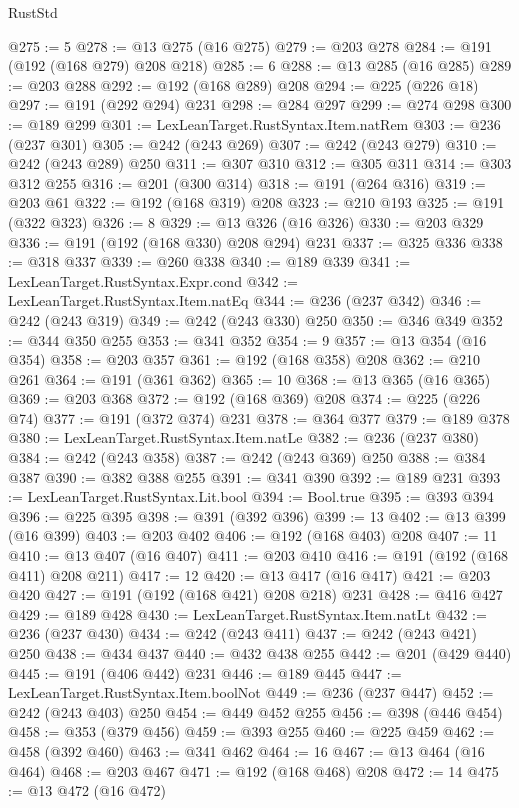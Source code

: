\begin{lexlean}{RustStd}
\begin{coremodule}
@275 := 5
@278 := @13 @275 (@16 @275)
@279 := @203 @278
@284 := @191 (@192 (@168 @279) @208 @218)
@285 := 6
@288 := @13 @285 (@16 @285)
@289 := @203 @288
@292 := @192 (@168 @289) @208
@294 := @225 (@226 @18)
@297 := @191 (@292 @294) @231
@298 := @284 @297
@299 := @274 @298
@300 := @189 @299
@301 := LexLeanTarget.RustSyntax.Item.natRem
@303 := @236 (@237 @301)
@305 := @242 (@243 @269)
@307 := @242 (@243 @279)
@310 := @242 (@243 @289) @250
@311 := @307 @310
@312 := @305 @311
@314 := @303 @312 @255
@316 := @201 (@300 @314)
@318 := @191 (@264 @316)
@319 := @203 @61
@322 := @192 (@168 @319) @208
@323 := @210 @193
@325 := @191 (@322 @323)
@326 := 8
@329 := @13 @326 (@16 @326)
@330 := @203 @329
@336 := @191 (@192 (@168 @330) @208 @294) @231
@337 := @325 @336
@338 := @318 @337
@339 := @260 @338
@340 := @189 @339
@341 := LexLeanTarget.RustSyntax.Expr.cond
@342 := LexLeanTarget.RustSyntax.Item.natEq
@344 := @236 (@237 @342)
@346 := @242 (@243 @319)
@349 := @242 (@243 @330) @250
@350 := @346 @349
@352 := @344 @350 @255
@353 := @341 @352
@354 := 9
@357 := @13 @354 (@16 @354)
@358 := @203 @357
@361 := @192 (@168 @358) @208
@362 := @210 @261
@364 := @191 (@361 @362)
@365 := 10
@368 := @13 @365 (@16 @365)
@369 := @203 @368
@372 := @192 (@168 @369) @208
@374 := @225 (@226 @74)
@377 := @191 (@372 @374) @231
@378 := @364 @377
@379 := @189 @378
@380 := LexLeanTarget.RustSyntax.Item.natLe
@382 := @236 (@237 @380)
@384 := @242 (@243 @358)
@387 := @242 (@243 @369) @250
@388 := @384 @387
@390 := @382 @388 @255
@391 := @341 @390
@392 := @189 @231
@393 := LexLeanTarget.RustSyntax.Lit.bool
@394 := Bool.true
@395 := @393 @394
@396 := @225 @395
@398 := @391 (@392 @396)
@399 := 13
@402 := @13 @399 (@16 @399)
@403 := @203 @402
@406 := @192 (@168 @403) @208
@407 := 11
@410 := @13 @407 (@16 @407)
@411 := @203 @410
@416 := @191 (@192 (@168 @411) @208 @211)
@417 := 12
@420 := @13 @417 (@16 @417)
@421 := @203 @420
@427 := @191 (@192 (@168 @421) @208 @218) @231
@428 := @416 @427
@429 := @189 @428
@430 := LexLeanTarget.RustSyntax.Item.natLt
@432 := @236 (@237 @430)
@434 := @242 (@243 @411)
@437 := @242 (@243 @421) @250
@438 := @434 @437
@440 := @432 @438 @255
@442 := @201 (@429 @440)
@445 := @191 (@406 @442) @231
@446 := @189 @445
@447 := LexLeanTarget.RustSyntax.Item.boolNot
@449 := @236 (@237 @447)
@452 := @242 (@243 @403) @250
@454 := @449 @452 @255
@456 := @398 (@446 @454)
@458 := @353 (@379 @456)
@459 := @393 @255
@460 := @225 @459
@462 := @458 (@392 @460)
@463 := @341 @462
@464 := 16
@467 := @13 @464 (@16 @464)
@468 := @203 @467
@471 := @192 (@168 @468) @208
@472 := 14
@475 := @13 @472 (@16 @472)

\end{coremodule}
\end{lexlean}
